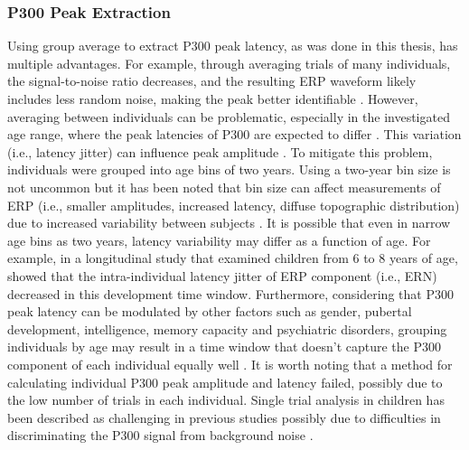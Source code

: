 \subsubsection{P300 Peak Extraction}
Using group average to extract P300 peak latency, as was done in this thesis, has multiple advantages. For example, through averaging trials of many individuals, the signal-to-noise ratio decreases, and the resulting ERP waveform likely includes less random noise, making the peak better identifiable \parencite{luckIntroductionEventrelatedPotential2014}. However, averaging between individuals can be problematic, especially in the investigated age range, where the peak latencies of P300 are expected to differ \parencite{vandinterenP300DevelopmentLifespan2014}. This variation (i.e., latency jitter) can influence peak amplitude \parencite{luckIntroductionEventrelatedPotential2014}. To mitigate this problem, individuals were grouped into age bins of two years. Using a two-year bin size is not uncommon but it has been noted that bin size can affect measurements of ERP (i.e., smaller amplitudes, increased latency, diffuse topographic distribution) due to increased variability between subjects \parencite{rigginsP300DevelopmentInfancy2020}. It is possible that even in narrow age bins as two years, latency variability may differ as a function of age. For example, in a longitudinal study that examined children from 6 to 8 years of age, \textcite{dupuisImplicationsOngoingNeural2015} showed that the intra-individual latency jitter of ERP component (i.e., ERN) decreased in this development time window. Furthermore, considering that P300 peak latency can be modulated by other factors such as gender, pubertal development, intelligence, memory capacity and psychiatric disorders, grouping individuals by age may result in a time window that doesn't capture the P300 component of each individual equally well \parencite{brumbackEfficiencyRespondingUnexpected2012,hansenneP300CognitiveEventrelated2000,lazzaroSingleTrialVariability1997,polichUpdatingP300Integrative2007,rigginsP300DevelopmentInfancy2020}. It is worth noting that a method for calculating individual P300 peak amplitude and latency \parencite[see.,][]{liesefeldEstimatingTimingCognitive2018} failed, possibly due to the low number of trials in each individual. Single trial analysis in children has been described as challenging in previous studies \parencite[e.g.,][]{miyazakiCharacteristicsAuditoryP3001994} possibly due to difficulties in discriminating the P300 signal from background noise \parencite{rigginsP300DevelopmentInfancy2020}. 

